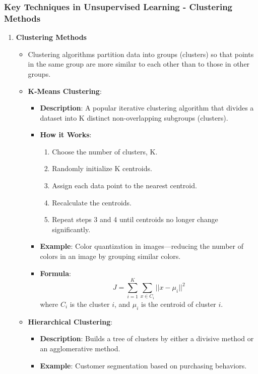\documentclass{beamer}
\begin{document}
\begin{frame}[fragile]
    \frametitle{Key Techniques in Unsupervised Learning - Clustering Methods}
    \begin{enumerate}
        \item \textbf{Clustering Methods}
        
        \begin{itemize}
            \item Clustering algorithms partition data into groups (clusters) so that points in the same group are more similar to each other than to those in other groups.
            
            \item \textbf{K-Means Clustering}:
            \begin{itemize}
                \item \textbf{Description}: A popular iterative clustering algorithm that divides a dataset into K distinct non-overlapping subgroups (clusters).
                \item \textbf{How it Works}:
                \begin{enumerate}
                    \item Choose the number of clusters, K.
                    \item Randomly initialize K centroids.
                    \item Assign each data point to the nearest centroid.
                    \item Recalculate the centroids.
                    \item Repeat steps 3 and 4 until centroids no longer change significantly.
                \end{enumerate}
                \item \textbf{Example}: Color quantization in images—reducing the number of colors in an image by grouping similar colors.
                \item \textbf{Formula}:
                \begin{equation}
                    J = \sum_{i=1}^{K} \sum_{x \in C_i} ||x - \mu_i||^2
                \end{equation}
                where \(C_i\) is the cluster \(i\), and \(\mu_i\) is the centroid of cluster \(i\).
            \end{itemize}
            
            \item \textbf{Hierarchical Clustering}:
            \begin{itemize}
                \item \textbf{Description}: Builds a tree of clusters by either a divisive method or an agglomerative method.
                \item \textbf{Example}: Customer segmentation based on purchasing behaviors.
            \end{itemize}
        \end{itemize}
    \end{enumerate}
\end{frame}
\end{document}
